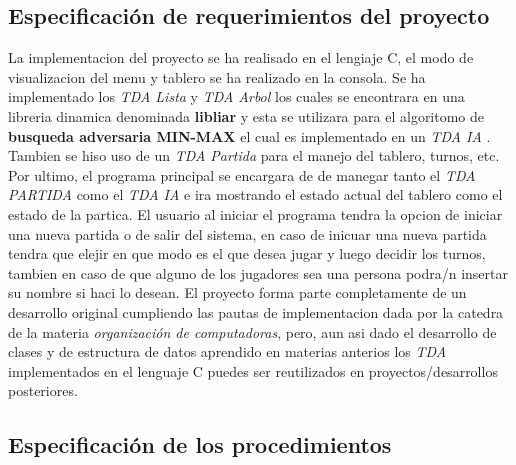 \documentclass[12pt,twocolum,a4paper]{article}
\begin{document}
\subsection{Especificaci\'on de requerimientos del proyecto}
\begin{frame}
    La implementacion del proyecto se ha realisado en el lengiaje C, el modo de visualizacion del menu y tablero se ha realizado en la consola. Se ha implementado los {\itshape TDA Lista} y {\itshape TDA Arbol} los cuales se encontrara en una libreria dinamica denominada {\bf libliar} y esta se utilizara para el algoritomo de {\bf busqueda adversaria MIN-MAX} el cual es implementado en un {\itshape TDA IA} . Tambien se hiso uso de un {\itshape TDA Partida} para el manejo del tablero, turnos, etc. Por ultimo, el programa principal se encargara de de manegar tanto el {\itshape TDA PARTIDA} como el {\itshape TDA IA} e ira mostrando el estado actual del tablero como el estado de la partica.
    \newline
    El usuario al iniciar el programa tendra la opcion de iniciar una nueva partida o de salir del sistema, en caso de inicuar una nueva partida tendra que elejir en que modo es el que desea jugar y luego decidir los turnos, tambien en caso de que alguno de los jugadores sea una persona podra/n insertar su nombre si haci lo desean.
    \newline
    El proyecto forma parte completamente de un desarrollo original cumpliendo las pautas de implementacion dada por la catedra de la materia {\itshape organizaci\'on de computadoras}, pero, aun asi dado el desarrollo de clases y de estructura de datos aprendido en materias anterios los {\itshape TDA} implementados en el lenguaje C puedes ser reutilizados en proyectos/desarrollos posteriores.
\end{frame}

\subsection{Especificaci\'on de los procedimientos}
\end{document}
